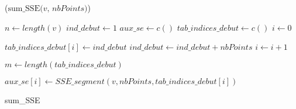 




\begin{algorithm}[h]
\DontPrintSemicolon
{}

\Begin($\text{sum\_SSE} {(} v, \, nbPoints{)}$)
{
  $n \leftarrow length(v)$\;
	$ind\_debut \leftarrow 1$\;
	$aux\_se \leftarrow c()$\;
	$tab\_indices\_debut \leftarrow c()$\;
	$i \leftarrow 0$\;
	
	{
		$tab\_indices\_debut[i] \leftarrow ind\_debut$\;
		$ind\_debut \leftarrow ind\_debut + nbPoints$\;
		$i \leftarrow i + 1$\;
	}
	
	$m \leftarrow length(tab\_indices\_debut)$\;
	
  {
		$aux\_se[i] \leftarrow SSE\_segment(v, nbPoints, tab\_indices\_debut[i]) $\;
  }


}
\caption{sum\_SSE}
\label{algo2}
\end{algorithm}
 
